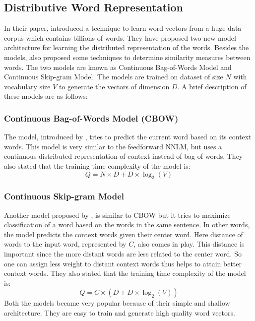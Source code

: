 \subsection{Distributive Word Representation}\label{w2v}
In their paper, \cite{mikolov2013efficient} introduced a technique to learn word vectors from a huge data corpus which contains billions of words. They have proposed two new model architecture for learning the distributed representation of the words. Besides the models, \cite{mikolov2013efficient} also proposed some techniques to determine similarity measures between words. The two models are known as Continuous Bag-of-Words Model and Continuous Skip-gram Model. The models are trained on dataset of size $N$ with vocabulary size $V$ to generate the vectors of dimension $D$. 
A brief description of these models are as follows:
\subsubsection{Continuous Bag-of-Words Model (CBOW)}
The model, introduced by \cite{mikolov2013efficient}, tries to predict the current word based on its context words. This model is very similar to the feedforward NNLM, but uses a continuous distributed representation of context instead of bag-of-words. They also stated that the training time complexity of the model is:
\begin{equation}
Q = N \times D + D \times \log_2(V)
\end{equation}
\subsubsection{Continuous Skip-gram Model}
Another model proposed by \cite{mikolov2013efficient}, is similar to CBOW but it tries to maximize classification of a word based on the words in the same sentence. In other words, the model predicts the context words given their center word. Here distance of words to the input word, represented by $C$, also comes in play. This distance is important since the more distant words are less related to the center word. So one can assign less weight to distant context words thus helps to attain better context words. They also stated that the training time complexity of the model is:
\begin{equation}
Q = C \times (D+D\times\log_2(V))
\end{equation}
Both the models became very popular because of their simple and shallow architecture. They are easy to train and generate high quality word vectors.
